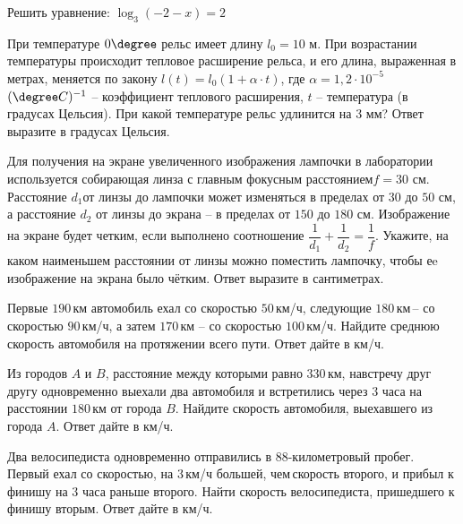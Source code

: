 \begin{homework}[number=2]
	\begin{listofex}
		\item Решить уравнение: \quad \( \log_3(-2-x)=2 \)
		\item При температуре \( 0\degree  \) рельс имеет длину \(  l_0=10\) м. При возрастании температуры происходит тепловое расширение рельса, и его длина, выраженная в метрах, меняется по закону \( l(t)=l_0(1+\alpha\cdot t) \), где \( \alpha = 1,2\cdot10^{-5} \) \( (\degree C)^{-1} \) – коэффициент теплового расширения, \( t \) – температура (в градусах Цельсия). При какой температуре рельс удлинится на \( 3 \) мм? Ответ выразите в градусах Цельсия.
		\item Для получения на экране увеличенного изображения лампочки в лаборатории используется собирающая линза с главным фокусным расстоянием\(  f = 30 \) см. Расстояние \( d_1  \)от линзы до лампочки может изменяться в пределах от \( 30 \) до \( 50 \) см, а расстояние \( d_2 \) от линзы до экрана – в пределах от \( 150 \) до \( 180 \) см. Изображение на экране будет четким, если выполнено соотношение \( \dfrac{1}{d_1}+\dfrac{1}{d_2}=\dfrac{1}{f} \). Укажите, на каком наименьшем расстоянии от линзы можно поместить лампочку, чтобы еe изображение на экрана было чётким. Ответ выразите в сантиметрах.
		\item Первые \( 190 \) км автомобиль ехал со скоростью \( 50 \) км/ч, следующие \( 180 \) км -- со скоростью \( 90 \) км/ч, а затем \( 170 \) км -- со скоростью \( 100 \) км/ч. Найдите среднюю скорость автомобиля на протяжении всего пути. Ответ дайте в км/ч.
		\item Из городов \( A \) и \( B \), расстояние между которыми равно \( 330 \) км, навстречу друг другу одновременно выехали два автомобиля и встретились через \( 3 \) часа на расстоянии \( 180 \) км от города \( B \). Найдите скорость автомобиля, выехавшего из города \( A \). Ответ дайте в км/ч.
		\item Два велосипедиста одновременно отправились в \( 88 \)-километровый пробег. Первый ехал со скоростью, на \( 3 \) км/ч большей, чем скорость второго, и прибыл к финишу на \( 3 \) часа раньше второго. Найти скорость велосипедиста, пришедшего к финишу вторым. Ответ дайте в км/ч.
	\end{listofex}
\end{homework}

